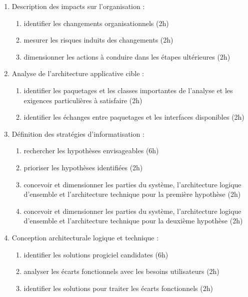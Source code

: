 \begin{enumerate}
          \begin{enumerate}
            \item Description des impacts sur l'organisation : 
                \begin{enumerate}
                  \item identifier les changements organisationnels (2h)
                  \item mesurer les risques induits des changements (2h)
                  \item dimensionner les actions à conduire dans les étapes ultérieures (2h)
                \end{enumerate}
            \item Analyse de l'architecture applicative cible : 
                \begin{enumerate}
                  \item identifier les paquetages et les classes importantes de l'analyse et les exigences particulières à satisfaire (2h)
                  \item identifier les échanges entre paquetages et les interfaces disponibles (2h)
                \end{enumerate}
            \item Définition des stratégies d'informatisation : 
                \begin{enumerate}
                  \item rechercher les hypothèses envisageables (6h)
                  \item prioriser les hypothèses identifiées (2h)
                  \item concevoir et dimensionner les parties du système, l'architecture logique d'ensemble et l'architecture technique pour la première hypothèse (2h)
                  \item concevoir et dimensionner les parties du système, l'architecture logique d'ensemble et l'architecture technique pour la deuxième hypothèse (2h)
                \end{enumerate}
            \item Conception architecturale logique et technique : 
                \begin{enumerate}
                  \item identifier les solutions progiciel candidates (6h)
                  \item analyser les écarts fonctionnels avec les besoins utilisateurs (2h)  
                  \item identifier les solutions pour traiter les écarts fonctionnels (2h)

\end{enumerate}
\end{enumerate}
\end{enumerate}
